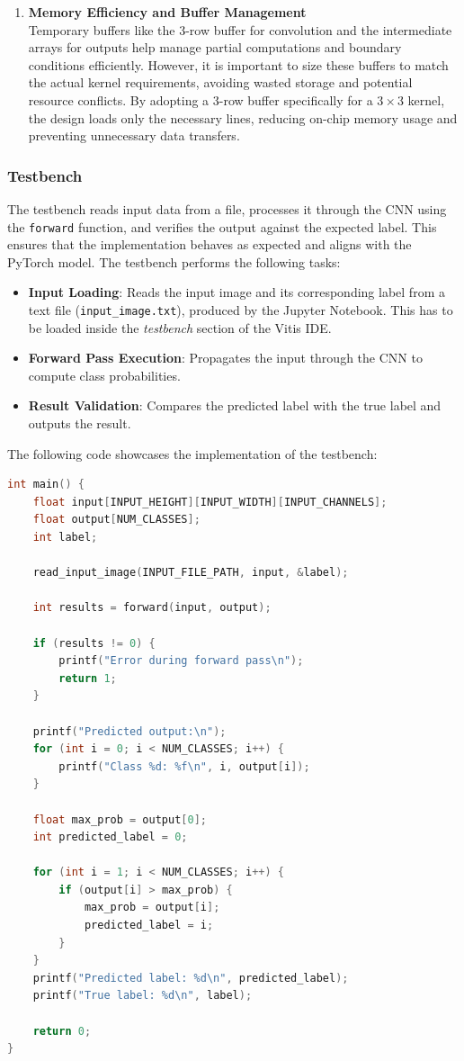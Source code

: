 \documentclass{article}
\begin{document}
\begin{enumerate}
    \item \textbf{Memory Efficiency and Buffer Management}\\
    Temporary buffers like the 3-row buffer for convolution and the intermediate arrays for outputs help manage partial computations and boundary conditions efficiently. However, it is important to size these buffers to match the actual kernel requirements, avoiding wasted storage and potential resource conflicts. By adopting a 3-row buffer specifically for a $3 \times 3$ kernel, the design loads only the necessary lines, reducing on-chip memory usage and preventing unnecessary data transfers.

\end{enumerate}

\subsubsection{Testbench}
The testbench reads input data from a file, processes it through the CNN using the \texttt{forward} function, and verifies the output against the expected label. This ensures that the implementation behaves as expected and aligns with the PyTorch model. The testbench performs the following tasks:

\begin{itemize}
    \item \textbf{Input Loading}: Reads the input image and its corresponding label from a text file (\texttt{input\_image.txt}), produced by the Jupyter Notebook. This has to be loaded inside the \textit{testbench} section of the Vitis IDE.
    \item \textbf{Forward Pass Execution}: Propagates the input through the CNN to compute class probabilities.
    \item \textbf{Result Validation}: Compares the predicted label with the true label and outputs the result.
\end{itemize}

The following code showcases the implementation of the testbench:

\begin{lstlisting}[language=C]
int main() {
    float input[INPUT_HEIGHT][INPUT_WIDTH][INPUT_CHANNELS];
    float output[NUM_CLASSES];
    int label;

    read_input_image(INPUT_FILE_PATH, input, &label);

    int results = forward(input, output);

    if (results != 0) {
        printf("Error during forward pass\n");
        return 1;
    }

    printf("Predicted output:\n");
    for (int i = 0; i < NUM_CLASSES; i++) {
        printf("Class %d: %f\n", i, output[i]);
    }

    float max_prob = output[0];
    int predicted_label = 0;

    for (int i = 1; i < NUM_CLASSES; i++) {
        if (output[i] > max_prob) {
            max_prob = output[i];
            predicted_label = i;
        }
    }
    printf("Predicted label: %d\n", predicted_label);
    printf("True label: %d\n", label);

    return 0;
}
\end{lstlisting}
\end{document}
